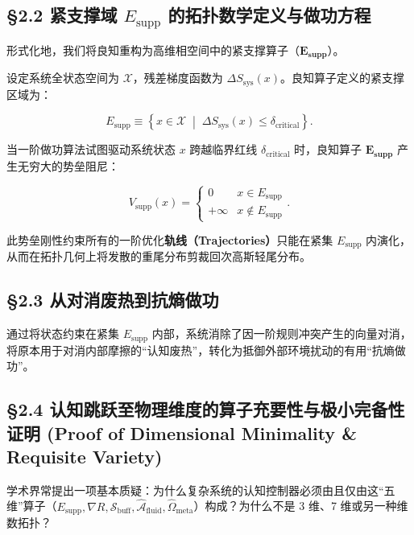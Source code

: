 \documentclass[11pt,a4paper,oneside]{ctexart}
\begin{document}
\subsection{§2.2 紧支撑域 $E_{\text{supp}}$ 的拓扑数学定义与做功方程}

形式化地，我们将良知重构为高维相空间中的\textit{}紧支撑算子（$\mathbf{E_{\text{supp}}}$）\textit{}。


设定系统全状态空间为 $\mathcal{X}$，残差梯度函数为 $\Delta S_{\text{sys}}(x)$。良知算子定义的紧支撑区域为：


\begin{equation}
E_{\text{supp}} \equiv \left\{ x \in \mathcal{X} \;\middle|\; \Delta S_{\text{sys}}(x) \le \delta_{\text{critical}} \right\}.
\end{equation}

当一阶做功算法试图驱动系统状态 $x$ 跨越临界红线 $\delta_{\text{critical}}$ 时，良知算子 $\mathbf{E_{\text{supp}}}$ 产生无穷大的势垒阻尼：


\begin{equation}
V_{\text{supp}}(x) = \begin{cases} 0 & x \in E_{\text{supp}} \\ +\infty & x \notin E_{\text{supp}} \end{cases}.
\end{equation}

此势垒刚性约束所有的一阶优化\textbf{轨线（Trajectories）}只能在紧集 $E_{\text{supp}}$ 内演化，从而在拓扑几何上将发散的重尾分布剪裁回次高斯轻尾分布。


\subsection{§2.3 从对消废热到抗熵做功}

通过将状态约束在紧集 $E_{\text{supp}}$ 内部，系统消除了因一阶规则冲突产生的向量对消，将原本用于对消内部摩擦的“认知废热”，转化为抵御外部环境扰动的有用“抗熵做功”。


\subsection{§2.4 认知跳跃至物理维度的算子充要性与极小完备性证明 (Proof of Dimensional Minimality \& Requisite Variety)}

学术界常提出一项基本质疑：\textit{}为什么复杂系统的认知控制器必须由且仅由这“五维”算子（$E_{\text{supp}}, \nabla R, \mathcal{S}_{\text{buff}}, \hat{\mathcal{A}}_{\text{fluid}}, \hat{\Omega}_{\text{meta}}$）构成？为什么不是 3 维、7 维或另一种维数拓扑？\textit{}
\end{document}
